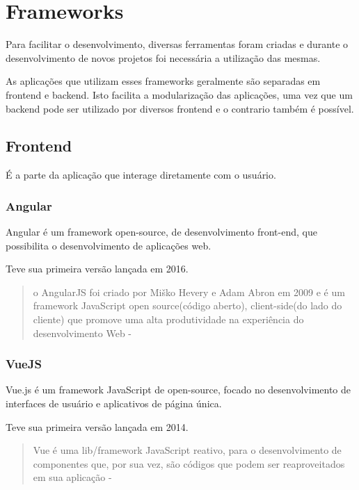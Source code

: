 \section{Frameworks}

Para facilitar o desenvolvimento, diversas ferramentas foram criadas e durante o desenvolvimento de novos projetos foi necessária a utilização das mesmas.

As aplicações que utilizam esses frameworks geralmente são separadas em frontend e backend. Isto facilita a modularização das aplicações, uma vez que um backend pode ser utilizado por diversos frontend e o contrario também é possível.

\subsection{Frontend}

É a parte da aplicação que interage diretamente com o usuário.

\subsubsection{Angular}

Angular é um framework open-source, de desenvolvimento front-end, que possibilita o desenvolvimento de aplicações web.

Teve sua primeira versão lançada em 2016.

\begin{quote}
  o AngularJS foi criado por Miško Hevery e Adam Abron  em  2009  e  é  um  framework  JavaScript open  source(código  aberto), client-side(do lado  do  cliente)  que  promove  uma  alta  produtividade  na  experiência  do  desenvolvimento Web - \cite{ferreira2018analise}
\end{quote}


\subsubsection{VueJS}

Vue.js é um framework JavaScript de open-source, focado no desenvolvimento de interfaces de usuário e aplicativos de página única.

Teve sua primeira versão lançada em 2014.

\begin{quote}
  Vue é uma lib/framework JavaScript reativo, para  o  desenvolvimento  de  componentes  que,  por  sua  vez,  são  códigos  que  podem  ser reaproveitados em sua aplicação - \cite{ferreira2018analise}
\end{quote}


